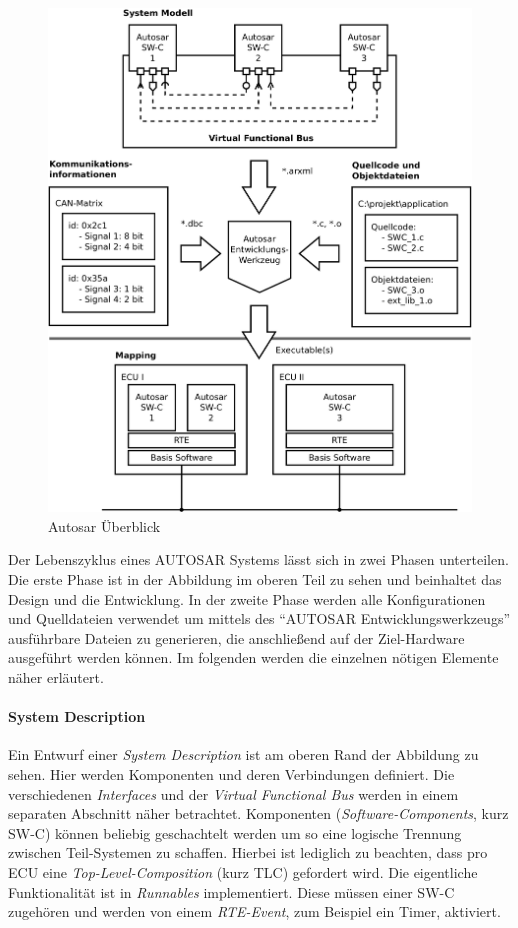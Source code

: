 \documentclass[
  a4paper,					    %
  twoside,
  DIV=calc,     				%
  bibliography=totoc,
  cleardoublepage=empty,
  ngerman,     					%
  final       					%
]{scrbook}
\begin{document}
\begin{figure}[p]
    \centering
    \includegraphics[width=1\textwidth]{autosar_overview.png}
    \caption{Autosar Überblick}
    \label{fig:autosar_overview}
\end{figure}

Der Lebenszyklus eines AUTOSAR Systems lässt sich in zwei Phasen unterteilen. Die erste Phase ist in der Abbildung im oberen Teil zu sehen und beinhaltet das Design und die Entwicklung. In der zweite Phase werden alle Konfigurationen und Quelldateien verwendet um mittels des "`AUTOSAR Entwicklungswerkzeugs"'  ausführbare Dateien zu generieren, die anschließend auf der Ziel-Hardware ausgeführt werden können. Im folgenden werden die einzelnen nötigen Elemente näher erläutert.


\paragraph{System Description} Ein Entwurf einer \emph{System Description} ist am oberen Rand der Abbildung zu sehen. Hier werden Komponenten und deren Verbindungen definiert. Die verschiedenen \emph{Interfaces} und der \emph{Virtual Functional Bus} werden in einem separaten Abschnitt näher betrachtet. Komponenten (\emph{Software-Components}, kurz SW-C) können beliebig geschachtelt werden um so eine logische Trennung zwischen Teil-Systemen zu schaffen. Hierbei ist lediglich zu beachten, dass pro ECU eine \emph{Top-Level-Composition} (kurz TLC) gefordert wird. Die eigentliche Funktionalität ist in \emph{Runnables} implementiert. Diese müssen einer SW-C zugehören und werden von einem \emph{RTE-Event}, zum Beispiel ein Timer, aktiviert.
\end{document}
